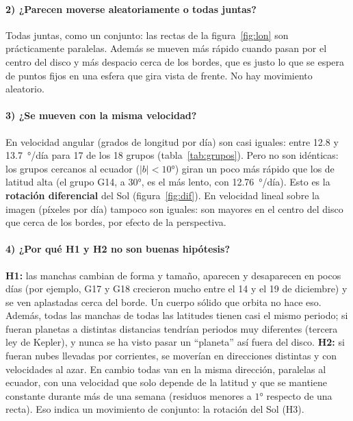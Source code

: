 \documentclass[11pt,a4paper]{article}
\begin{document}
\paragraph{2) ¿Parecen moverse aleatoriamente o todas juntas?}
Todas juntas, como un conjunto: las rectas de la figura~\ref{fig:lon} son prácticamente paralelas. Además se mueven más rápido
cuando pasan por el centro del disco y más despacio cerca de los bordes, que es justo lo que se espera de puntos fijos en una esfera
que gira vista de frente. No hay movimiento aleatorio.

\paragraph{3) ¿Se mueven con la misma velocidad?}
En velocidad angular (grados de longitud por día) son casi iguales: entre 12.8 y \SI{13.7}{\degree/día} para 17 de los 18 grupos
(tabla~\ref{tab:grupos}). Pero no son idénticas: los grupos cercanos al ecuador ($|b|<\ang{10}$) giran un poco más rápido que los
de latitud alta (el grupo G14, a $\ang{+30}$, es el más lento, con \SI{12.76}{\degree/día}). Esto es la \textbf{rotación diferencial}
del Sol (figura~\ref{fig:dif}). En velocidad lineal sobre la imagen (píxeles por día) tampoco son iguales: son mayores en el centro
del disco que cerca de los bordes, por efecto de la perspectiva.

\paragraph{4) ¿Por qué H1 y H2 no son buenas hipótesis?}
\textbf{H1:} las manchas cambian de forma y tamaño, aparecen y desaparecen en pocos días (por ejemplo, G17 y G18 crecieron mucho entre
el 14 y el 19 de diciembre) y se ven aplastadas cerca del borde. Un cuerpo sólido que orbita no hace eso. Además, todas las manchas de
todas las latitudes tienen casi el mismo periodo; si fueran planetas a distintas distancias tendrían periodos muy diferentes
(tercera ley de Kepler), y nunca se ha visto pasar un ``planeta'' así fuera del disco.
\textbf{H2:} si fueran nubes llevadas por corrientes, se moverían en direcciones distintas y con velocidades al azar. En cambio
todas van en la misma dirección, paralelas al ecuador, con una velocidad que solo depende de la latitud y que se mantiene constante
durante más de una semana (residuos menores a $\ang{1}$ respecto de una recta). Eso indica un movimiento de conjunto: la rotación del Sol (H3).

\end{document}
